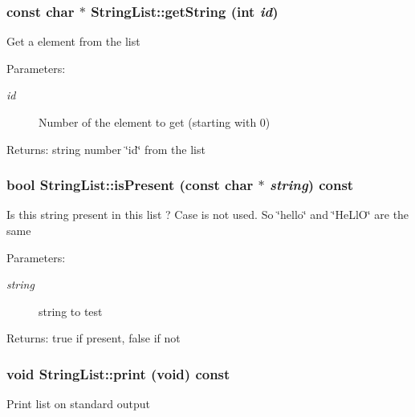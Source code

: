 \subsubsection{\setlength{\rightskip}{0pt plus 5cm}const char $\ast$ StringList::getString (int {\em id})}\label{classStringList_b4302e82856c098ef417bb7e368b4905}


Get a element from the list \begin{Desc}
\item[Parameters:]
\begin{description}
\item[{\em id}]Number of the element to get (starting with 0) \end{description}
\end{Desc}
\begin{Desc}
\item[Returns:]string number \char`\"{}id\char`\"{} from the list \end{Desc}
\subsubsection{\setlength{\rightskip}{0pt plus 5cm}bool StringList::isPresent (const char $\ast$ {\em string}) const}\label{classStringList_9aab3032d69d1b6fa92c8490cbd516eb}


Is this string present in this list ? Case is not used. So \char`\"{}hello\char`\"{} and \char`\"{}HeLlO\char`\"{} are the same \begin{Desc}
\item[Parameters:]
\begin{description}
\item[{\em string}]string to test \end{description}
\end{Desc}
\begin{Desc}
\item[Returns:]true if present, false if not \end{Desc}
\subsubsection{\setlength{\rightskip}{0pt plus 5cm}void StringList::print (void) const}\label{classStringList_5935a5cf7dd3792c0f53de6b4c8cc56e}


Print list on standard output 
